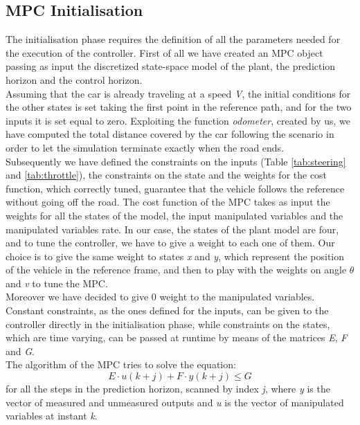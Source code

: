 \subsection{MPC Initialisation}
The initialisation phase requires the definition of all the parameters needed for the execution of the controller.
First of all we have created an MPC object passing as input the discretized state-space model of the plant, the prediction horizon and the control horizon.
\\Assuming that the car is already traveling at a speed \textit{V}, the initial conditions for the other states is set taking the first point in the reference path, and for the two inputs it is set equal to zero. Exploiting the function \textit{odometer}, created by us, we have computed the total distance covered by the car following the scenario in order to let the simulation terminate exactly when the road ends.
\\Subsequently we have defined the constraints on the inputs (Table \ref{tab:steering} and \ref{tab:throttle}), the constraints on the state and the weights for the cost function, which correctly tuned, guarantee that the vehicle follows the reference without going off the road.
The cost function of the MPC takes as input the weights for all the states of the model, the input manipulated variables and the manipulated variables rate. In our case, the states of the plant model are four, and to tune the controller, we have to give a weight to each one of them. Our choice is to give the same weight to states \textit{x} and \textit{y}, which represent the position of the vehicle in the reference frame, and then to play with the weights on angle $\theta$ and \textit{v} to tune the MPC.\\
Moreover we have decided to give 0 weight to the manipulated variables.\\
Constant constraints, as the ones defined for the inputs, can be given to the controller directly in the initialisation phase, while constraints on the states, which are time varying, can be passed at runtime by means of the matrices \textit{E}, \textit{F} and \textit{G}. \\
The algorithm of the MPC tries to solve the equation:
\begin{equation}
    E \cdot u(k+j) + F \cdot y(k+j)\leq G
    \label{ConstraintEquation}
\end{equation}
for all the steps in the prediction horizon, scanned by index \textit{j}, where \textit{y} is the vector of measured and unmeasured outputs and \textit{u} is the vector of manipulated variables at instant \textit{k}.





